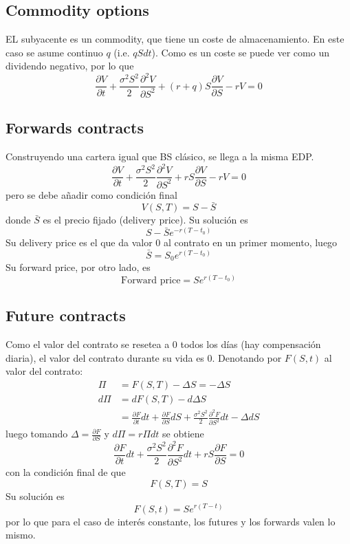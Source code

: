 \subsection{Commodity options}
EL subyacente es un commodity, que tiene un coste de almacenamiento. En este caso se asume continuo $q$ (i.e. $qSdt$). Como es un coste se puede ver como un dividendo negativo, por lo que
\[
\boxed{\frac{\partial V}{\partial t} + \frac{\sigma^2S^2}{2} \frac{\partial^2 V}{\partial S^2} + (r+q)S \frac{\partial V}{\partial S} -rV = 0}
\]




\subsection{Forwards contracts}\label{sec:ForwardsContracts}
Construyendo una cartera igual que BS clásico, se llega a la misma EDP.%
\[
\boxed{\frac{\partial V}{\partial t} + \frac{\sigma^2S^2}{2} \frac{\partial^2 V}{\partial S^2} + rS \frac{\partial V}{\partial S} -rV = 0}
\]
pero se debe añadir como condición final
\[\boxed{V(S,T)=S-\bar{S}}\]
donde $\bar{S}$ es el precio fijado (delivery price). Su solución es
\[
\boxed{S-\bar{S}e^{-r(T-t_0)}}
\]
Su delivery price es el que da valor 0 al contrato en un primer momento, luego 
\[
\bar{S} = S_0e^{r(T-t_0)}
\]
Su forward price, por otro lado, es  
\[
\text{Forward price} = Se^{r(T-t_0)}
\]




\subsection{Future contracts}\label{sec:FutureContracts}
Como el valor del contrato se resetea a 0 todos los días (hay compensación diaria), el valor del contrato durante su vida es 0. Denotando por $F(S,t)$ al valor del contrato:
\begin{align*}
    \Pi &= F(S,T) - \Delta S = - \Delta S \\
    d\Pi &= dF(S,T) - d\Delta S \\
    &= \frac{\partial F}{\partial t}dt + \frac{\partial F}{\partial S}dS + \frac{\sigma^2S^2}{2} \frac{\partial^2 F}{\partial S^2}dt - \Delta dS
\end{align*}
luego tomando $\Delta = \frac{\partial F}{\partial S}$ y $d\Pi=r\Pi dt$ se obtiene
\[
\boxed{\frac{\partial F}{\partial t}dt + \frac{\sigma^2S^2}{2} \frac{\partial^2 F}{\partial S^2}dt + rS\frac{\partial F}{\partial S} = 0}
\]
con la condición final de que
\[
\boxed{F(S,T) = S}
\]
Su solución es
\[\boxed{F(S,t) = Se^{r(T-t)}}\]
por lo que para el caso de interés constante, los futures y los forwards valen lo mismo.






